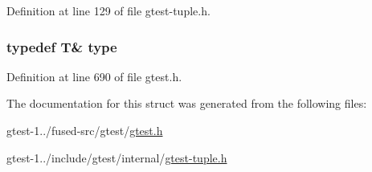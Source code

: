 \-Definition at line 129 of file gtest-\/tuple.\-h.

\hypertarget{structstd_1_1tr1_1_1gtest__internal_1_1AddRef_3_01T_01_6_01_4_a08e05528fbb401bd8299a21d67d13ee3}{
\subsubsection[{type}]{\setlength{\rightskip}{0pt plus 5cm}typedef \-T\& {\bf type}}}\label{d7/d61/structstd_1_1tr1_1_1gtest__internal_1_1AddRef_3_01T_01_6_01_4_a08e05528fbb401bd8299a21d67d13ee3}


\-Definition at line 690 of file gtest.\-h.



\-The documentation for this struct was generated from the following files\-:\begin{DoxyCompactItemize}
\item 
gtest-\/1../fused-\/src/gtest/\hyperlink{fused-src_2gtest_2gtest_8h}{gtest.\-h}\item 
gtest-\/1../include/gtest/internal/\hyperlink{gtest-tuple_8h}{gtest-\/tuple.\-h}\end{DoxyCompactItemize}
